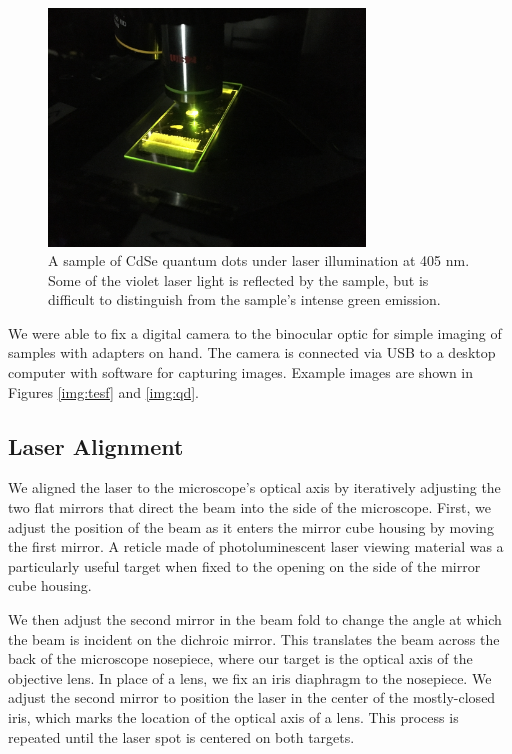 \begin{figure}[H]
    \centering
    \includegraphics[width=0.75\textwidth]{img/objective-sample.JPG}
    \caption[Sample on stage under laser illumination.]{A sample of CdSe quantum dots under laser illumination at 405 nm. Some of the violet laser light is reflected by the sample, but is difficult to distinguish from the sample's intense green emission.}
    \label{img:objective-sample}
\end{figure}

We were able to fix a digital camera to the binocular optic for simple imaging of samples with adapters on hand. The camera is connected via USB to a desktop computer with software for capturing images. Example images are shown in Figures \ref{img:tesf} and \ref{img:qd}.


\subsection{Laser Alignment}
We aligned the laser to the microscope's optical axis by iteratively adjusting the two flat mirrors that direct the beam into the side of the microscope. First, we adjust the position of the beam as it enters the mirror cube housing by moving the first mirror. A reticle made of photoluminescent laser viewing material was a particularly useful target when fixed to the opening on the side of the mirror cube housing. 

We then adjust the second mirror in the beam fold to change the angle at which the beam is incident on the dichroic mirror. This translates the beam across the back of the microscope nosepiece, where our target is the optical axis of the objective lens. In place of a lens, we fix an iris diaphragm to the nosepiece. We adjust the second mirror to position the laser in the center of the mostly-closed iris, which marks the location of the optical axis of a lens. This process is repeated until the laser spot is centered on both targets.

